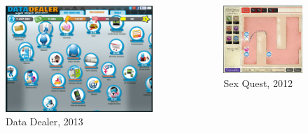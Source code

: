 \documentclass[usepdftitle=false]{beamer}
\begin{document}
\begin{frame}
		\begin{columns}[T]
			\begin{column}{5cm}
				\begin{figure}
    					\includegraphics[scale=0.1]{datad.jpg}
    					\caption{{\tiny Data Dealer, 2013}}
				\end{figure}
			\end{column}

			\begin{column}{5cm}
				\begin{figure}
    					\includegraphics[scale=0.17]{sq.jpg}
    					\caption{{\tiny Sex Quest, 2012}}
				\end{figure}
			\end{column}
		\end{columns}
	\end{frame}
	
\end{document}
